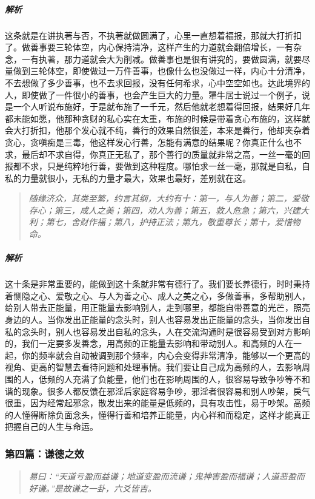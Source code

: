 \subparagraph{解析} 这条就是在讲执著与否，不执著就做圆满了，心里一直想着福报，那就大打折扣了。做善事要三轮体空，内心保持清净，这样产生的力道就会翻倍增长，一有杂念，一有执著，那力道就会大为削减。做善事也是很有讲究的，要做圆满，就要尽量做到三轮体空，即使做过一万件善事，也像什么也没做过一样，内心十分清净，不去想做了多少善事，也不去求回报，没有任何希求，心中空空如也。达此境界的人，即使做了一件很小的善事，也会产生巨大的力量。犟牛居士说过一个例子，说是一个人听说布施好，于是就布施了一千元，然后他就老想着得回报，结果好几年都未能如愿，他那种贪财的私心实在太重，布施的时候是带着贪心布施的，这样就会大打折扣，他那个发心就不纯，善行的效果自然很差，本来是善行，他却夹杂着贪心，贪嗔痴是三毒，他这样发心行善，怎能有满意的结果呢？你真正什么也不求，最后却不求自得，你真正无私了，那个善行的质量就非常之高，一丝一毫的回报都不求，只是纯粹地行善，要做到这种程度。哪怕求一丝一毫，那就是自私，自私的力量就很小，无私的力量才最大，效果也最好，差别就在这。

\begin{quote}\it
    随缘济众，其类至繁，约言其纲，大约有十：第一，与人为善；第二，爱敬存心；第三，成人之美；第四，劝人为善；第五，救人危急；第六，兴建大利；第七，舍财作福；第八，护持正法；第九，敬重尊长；第十，爱惜物命。
\end{quote}

\subparagraph{解析} 这十条是非常重要的，能做到这十条就非常有德行了。我们要长养德行，时时秉持着恻隐之心、爱敬之心、与人为善之心、成人之美之心，多做善事，多帮助别人，给别人带去正能量，用正能量去影响别人，走到哪里，都能自带善意的光芒，照亮身边的人。当你发出正能量的念头时，别人也容易发出正能量的念头，当你发出自私的念头时，别人也容易发出自私的念头，人在交流沟通时是很容易受到对方影响的，我们一定要多发善念，用高频的正能量去影响和带动别人。和高频的人在一起，你的频率就会自动被调到那个频率，内心会变得非常清净，能够以一个更高的视角、更高的智慧去看待问题和处理事情。我们要让自己成为高频的人，去影响周围的人，低频的人充满了负能量，他们也在影响周围的人，很容易导致争吵等不和谐的现象。很多人都反馈在邪淫后家庭容易争吵，邪淫者很容易和别人吵架，戾气很重，因为经常起邪念，散发出来的能量是低频的，具有攻击性，易于吵架。高频的人懂得断除负面念头，懂得行善和培养正能量，内心祥和而稳定，这样才能真正把握自己的人生与命运。

\subsubsection{第四篇：谦德之效}

\begin{quote}\it
    易曰：“天道亏盈而益谦；地道变盈而流谦；鬼神害盈而福谦；人道恶盈而好谦。”是故谦之一卦，六爻皆吉。
\end{quote}

